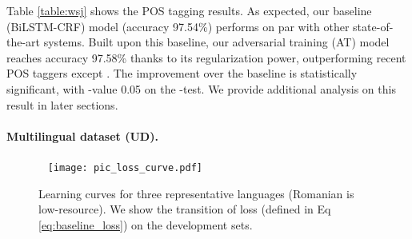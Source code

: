 \documentclass[11pt,a4paper]{article}
\begin{document}
\begin{table}[!t]
\setlength{\extrarowheight}{1pt}
\centering
{}\vspace{-1mm}

\caption{POS tagging accuracy on the PTB-WSJ test set, with other top-performing systems.
}
\label{table:wsj}
\vspace{-4mm}
\end{table}

Table \ref{table:wsj} shows the POS tagging results.
As expected, our baseline (BiLSTM-CRF) model (accuracy 97.54\%) performs on par with other state-of-the-art systems.
Built upon this baseline, our adversarial training (AT) model reaches accuracy 97.58\% thanks to its regularization power, outperforming recent POS taggers except .
The improvement over the baseline is statistically significant, with -value \scalebox{0.9}{} 0.05 on the -test.
We provide additional analysis on this result in later sections.



\paragraph{Multilingual dataset (UD).}

\begin{figure*}[!h]
    ~\vspace{-1.4mm}\centering
    \texttt{[image: pic\_loss\_curve.pdf]}
    \caption{Learning curves for three representative languages (Romanian is low-resource). We show the transition of loss (defined in Eq \protect\ref{eq:baseline_loss}) on the development sets.
    }
    \label{fig:learning_curve}
\vspace{-4mm}
\end{figure*}
\end{document}
